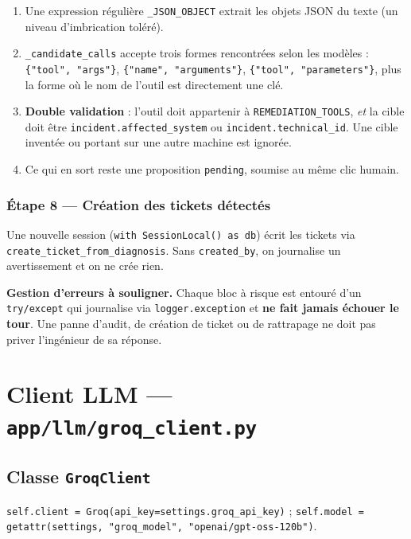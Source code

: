 \documentclass[11pt,a4paper]{report}
\newcommand{\file}[1]{\texttt{\small #1}}
\newcommand{\fn}[1]{\texttt{\small\textcolor{oasisviolet}{#1}}}
\newcommand{\cls}[1]{\texttt{\small\textcolor{oasisblue}{#1}}}
\begin{document}
\begin{enumerate}
  \item Une expression régulière \fn{\_JSON\_OBJECT} extrait les objets JSON du
  texte (un niveau d'imbrication toléré).
  \item \fn{\_candidate\_calls} accepte trois formes rencontrées selon les
  modèles : \texttt{\{"tool", "args"\}}, \texttt{\{"name", "arguments"\}},
  \texttt{\{"tool", "parameters"\}}, plus la forme où le nom de l'outil est
  directement une clé.
  \item \textbf{Double validation} : l'outil doit appartenir à
  \texttt{REMEDIATION\_TOOLS}, \emph{et} la cible doit être
  \texttt{incident.affected\_system} ou \texttt{incident.technical\_id}. Une
  cible inventée ou portant sur une autre machine est ignorée.
  \item Ce qui en sort reste une proposition \texttt{pending}, soumise au même
  clic humain.
\end{enumerate}

\subsubsection*{Étape 8 --- Création des tickets détectés}
Une nouvelle session (\texttt{with SessionLocal() as db}) écrit les tickets via
\fn{create\_ticket\_from\_diagnosis}. Sans \texttt{created\_by}, on journalise un
avertissement et on ne crée rien.

\begin{warnbox}
\textbf{Gestion d'erreurs à souligner.} Chaque bloc à risque est entouré d'un
\texttt{try/except} qui journalise via \fn{logger.exception} et \textbf{ne fait
jamais échouer le tour}. Une panne d'audit, de création de ticket ou de
rattrapage ne doit pas priver l'ingénieur de sa réponse.
\end{warnbox}

\section{Client LLM --- \file{app/llm/groq\_client.py}}

\subsection*{Classe \cls{GroqClient}}
\texttt{self.client = Groq(api\_key=settings.groq\_api\_key)} ;
\texttt{self.model = getattr(settings, "groq\_model", "openai/gpt-oss-120b")}.
\end{document}
